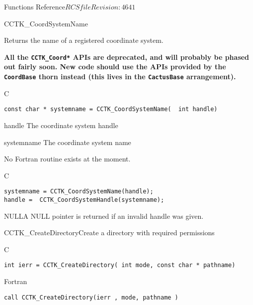 \begin{cactuspart}{ Functions Reference}{$RCSfile$}{$Revision: 4641 $}

\begin{FunctionDescription}{CCTK\_CoordSystemName}%
{Returns the name of a registered coordinate system.

\textbf{All the \texttt{CCTK\_Coord*} APIs are deprecated,
and will probably be phased out fairly soon.
New code should use the APIs provided by the \texttt{CoordBase} thorn
instead (this lives in the \texttt{CactusBase} arrangement).}
}
\label{CCTK-CoordSystemName}
\begin{SynopsisSection}
\begin{Synopsis}{C}
\begin{verbatim}const char * systemname = CCTK_CoordSystemName(  int handle)\end{verbatim}
\end{Synopsis}
\end{SynopsisSection}
\begin{ParameterSection}
\begin{Parameter}{handle}
The coordinate system handle
\end{Parameter}
\begin{Parameter}{systemname}
The coordinate system name
\end{Parameter}
\end{ParameterSection}
\begin{Discussion}
No Fortran routine exists at the moment.
\end{Discussion}
\begin{ExampleSection}
\begin{Example}{C}
\begin{verbatim}
systemname = CCTK_CoordSystemName(handle);
handle =  CCTK_CoordSystemHandle(systemname);
\end{verbatim}
\end{Example}
\end{ExampleSection}
\begin{ErrorSection}
\begin{Error}{NULL}A NULL pointer is returned if an invalid handle was given.\end{Error}
\end{ErrorSection}
\end{FunctionDescription}


\begin{FunctionDescription}{CCTK\_CreateDirectory}{Create a directory with required permissions}
\label{CCTK-CreateDirectory}
\begin{SynopsisSection}
\begin{Synopsis}{C}
\begin{verbatim}int ierr = CCTK_CreateDirectory( int mode, const char * pathname)\end{verbatim}
\end{Synopsis}
\begin{Synopsis}{Fortran}
\begin{verbatim}call CCTK_CreateDirectory(ierr , mode, pathname )


\end{verbatim}
\end{Synopsis}
\end{SynopsisSection}
\end{FunctionDescription}
\end{cactuspart}
